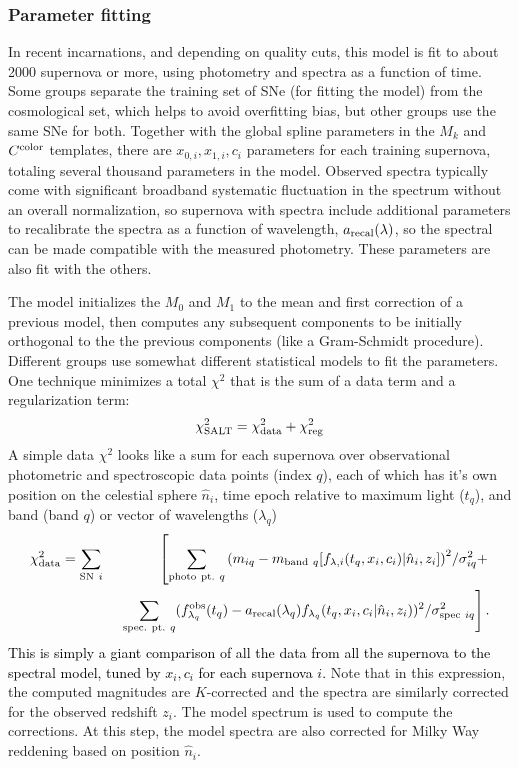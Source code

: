 \subsubsection{Parameter fitting}
In recent incarnations, and depending on quality cuts, this model is fit to about 2000 supernova or more, using photometry and spectra as a function of time. Some groups separate the training set of SNe (for fitting the model) from the cosmological set, which helps to avoid overfitting bias, but other groups use the same SNe for both. Together with the global spline parameters in the $M_k$ and $C^{\rm color}$ templates, there are $x_{0,i}, x_{1,i}, c_i$ parameters for each training supernova, totaling several thousand parameters in the model.  Observed spectra typically come with significant broadband systematic fluctuation in the spectrum without an overall normalization, so supernova with spectra include additional parameters to recalibrate the spectra as a function of wavelength, $a_{\rm recal}(\lambda)$, so the spectral can be made compatible with the measured photometry.  These parameters are also fit with the others.  

The model initializes the $M_0$ and $M_1$ to the mean and first correction of a previous model, then computes any subsequent components to be initially orthogonal to the the previous components ({like a Gram-Schmidt procedure}).
Different groups use somewhat different statistical models to fit the parameters.  One technique minimizes a total $\chi^2$ that is the sum of a data term and a regularization term:
\begin{equation}
  \chi^2_{\rm SALT} = \chi^2_{\rm data} + \chi^2_{\rm reg}
\end{equation}
A simple data $\chi^2$ looks like a sum for each supernova over observational photometric and spectroscopic data points (index $q$), each of which has it's own position on the celestial sphere $\hat n_i$, time epoch relative to maximum light ($t_q$), and band (band $q$) or vector of wavelengths ($\lambda_q$)
\textcolor{black} {
\begin{eqnarray}
  \chi^2_{\rm data} = \sum_{{\rm SN}\ i} && \left[ \sum_{{\rm photo\ pt.}\ q} {\left(m_{iq} - m_{{\rm band}\ q}[f_{\lambda,i} (t_q,x_i,c_i)|\hat n_i,z_i]\right)^2}/{\sigma_{iq}^2} + \right.
    \\ \nonumber
    &&  \ \left. \sum_{{\rm spec.\ pt.}\ q} (f^{\rm obs}_{\lambda_q}(t_q) - a_{\rm recal}(\lambda_q) f_{\lambda_q}(t_q,x_i,c_i|\hat n_i,z_i) )^2/\sigma_{{\rm spec\ }iq}^2    \right].
\end{eqnarray}
This is simply a giant comparison of all the data from all the supernova to the spectral model, tuned by $x_i,c_i$ for each supernova $i$.}  Note that in this expression, the computed magnitudes are $K$-corrected and the spectra are similarly corrected for the observed redshift $z_i$.  The model spectrum is used to compute the corrections.  At this step, the model spectra are also corrected for Milky Way reddening based on position $\hat n_i$.   


